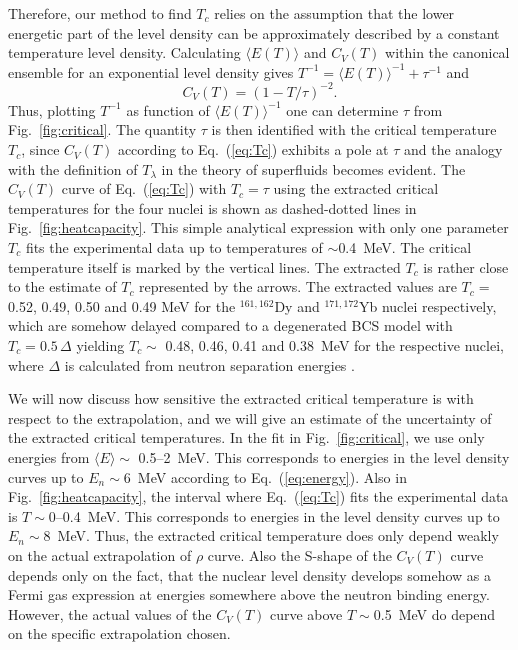 Therefore, our method to find $T_c$ relies on the assumption that the lower 
energetic part of the level density can be approximately described by a 
constant temperature level density. Calculating $\langle E(T)\rangle$ and
$C_V(T)$ within the canonical ensemble for an exponential level density gives 
$T^{-1}=\langle E(T)\rangle^{-1}+\tau^{-1}$ and 
\begin{equation}
\label{eq:Tc}
C_V(T)=(1-T/\tau)^{-2}.
\end{equation}
Thus, plotting $T^{-1}$ as function of $\langle E(T)\rangle^{-1}$ one can  
determine $\tau$ from Fig.~\ref{fig:critical}. The quantity $\tau$ is then 
identified with the critical temperature $T_c$, since $C_V(T)$ according to 
Eq.~(\ref{eq:Tc}) exhibits a pole at $\tau$ and the analogy with the definition
of $T_\lambda$ in the theory of superfluids becomes evident. The $C_V(T)$ curve
of Eq.~(\ref{eq:Tc}) with $T_c=\tau$ using the extracted critical temperatures 
for the four nuclei is shown as dashed-dotted lines in 
Fig.~\ref{fig:heatcapacity}. This simple analytical expression with only one 
parameter $T_c$ fits the experimental data up to temperatures of $\sim$0.4~MeV.
The critical temperature itself is marked by the vertical lines. The extracted 
$T_c$ is rather close to the estimate of $T_c$ represented by the arrows.
The extracted values are $T_c=$ 0.52, 0.49, 0.50 and 0.49 MeV for the 
$^{161,162}$Dy and $^{171,172}$Yb nuclei respectively, which are somehow 
delayed compared to a degenerated BCS model with $T_c=0.5\,\Delta$ yielding 
$T_c\sim$ 0.48, 0.46, 0.41 and 0.38~MeV for the respective nuclei, where 
$\Delta$ is calculated from neutron separation energies \cite{FS96}. 

We will now discuss how sensitive the extracted critical temperature is with
respect to the extrapolation, and we will give an estimate of the uncertainty
of the extracted critical temperatures. In the fit in Fig.~\ref{fig:critical},
we use only energies from $\langle E\rangle\sim$ 0.5--2~MeV. This corresponds
to energies in the level density curves up to $E_n\sim$6~MeV according to 
Eq.~(\ref{eq:energy}). Also in Fig.~\ref{fig:heatcapacity}, the interval where
Eq.~(\ref{eq:Tc}) fits the experimental data is $T\sim$0--0.4~MeV. This
corresponds to energies in the level density curves up to $E_n\sim$8~MeV. Thus,
the extracted critical temperature does only depend weakly on the actual 
extrapolation of $\rho$ curve. Also the S-shape of the $C_V(T)$ curve depends 
only on the fact, that the nuclear level density develops somehow as a Fermi 
gas expression at energies somewhere above the neutron binding energy. However,
the actual values of the $C_V(T)$ curve above $T\sim$0.5~MeV do depend on the 
specific extrapolation chosen.

